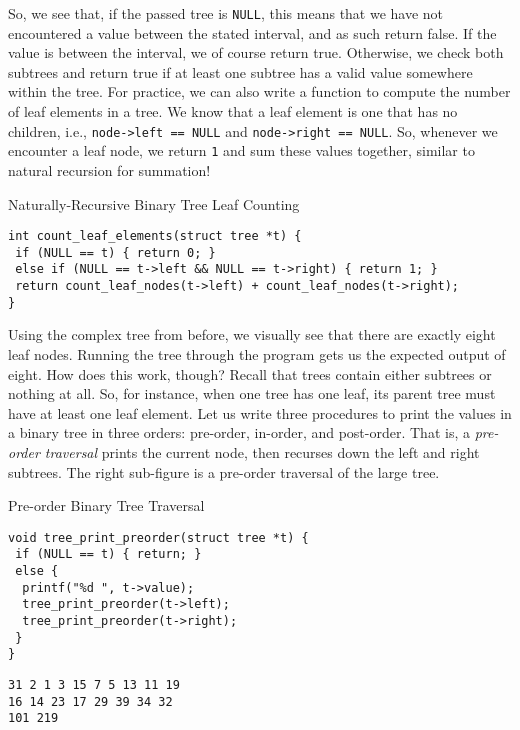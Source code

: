 So, we see that, if the passed tree is \texttt{NULL}, this means that we have not encountered a value between the stated interval, and as such return false. If the value is between the interval, we of course return true. Otherwise, we check both subtrees and return true if at least one subtree has a valid value somewhere within the tree. For practice, we can also write a function to compute the number of leaf elements in a tree. We know that a leaf element is one that has no children, i.e., \texttt{node->left == NULL} and \texttt{node->right == NULL}. So, whenever we encounter a leaf node, we return \texttt{1} and sum these values together, similar to natural recursion for summation!

\begin{cl}[main.c]{Naturally-Recursive Binary Tree Leaf Counting}\begin{lstlisting}[language=MyC]
int count_leaf_elements(struct tree *t) {
 if (NULL == t) { return 0; }
 else if (NULL == t->left && NULL == t->right) { return 1; }
 return count_leaf_nodes(t->left) + count_leaf_nodes(t->right);
}
\end{lstlisting}\end{cl}

Using the complex tree from before, we visually see that there are exactly eight leaf nodes. Running the tree through the program gets us the expected output of eight. How does this work, though? Recall that trees contain either subtrees or nothing at all. So, for instance, when one tree has one leaf, its parent tree must have at least one leaf element. Let us write three procedures to print the values in a binary tree in three orders: pre-order, in-order, and post-order. That is, a \textit{pre-order traversal} prints the current node, then recurses down the left and right subtrees. The right sub-figure is a pre-order traversal of the large tree.

\begin{clo}[main.c]{Pre-order Binary Tree Traversal}\begin{lstlisting}[language=MyC]
void tree_print_preorder(struct tree *t) {
 if (NULL == t) { return; }
 else {
  printf("%d ", t->value);
  tree_print_preorder(t->left);
  tree_print_preorder(t->right);
 }
}
\end{lstlisting}
\tcblower
\begin{lstlisting}[language=MyOutput]
31 2 1 3 15 7 5 13 11 19 
16 14 23 17 29 39 34 32 
101 219
\end{lstlisting}
\end{clo}

